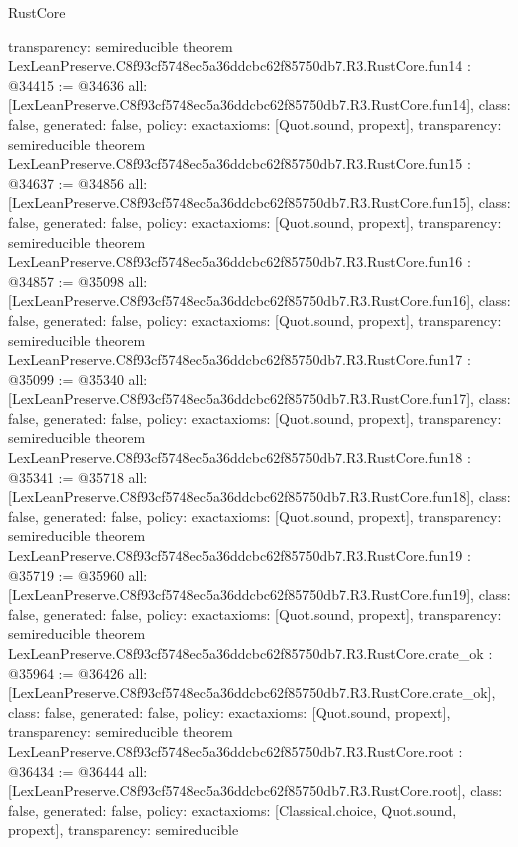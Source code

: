 \begin{lexlean}{RustCore}
\begin{coremodule}
{  transparency: semireducible
}
theorem LexLeanPreserve.C8f93cf5748ec5a36ddcbc62f85750db7.R3.RustCore.fun14 : @34415 := @34636 {
  all: [LexLeanPreserve.C8f93cf5748ec5a36ddcbc62f85750db7.R3.RustCore.fun14],
  class: false,
  generated: false,
  policy: exact{axioms: [Quot.sound, propext]},
  transparency: semireducible
}
theorem LexLeanPreserve.C8f93cf5748ec5a36ddcbc62f85750db7.R3.RustCore.fun15 : @34637 := @34856 {
  all: [LexLeanPreserve.C8f93cf5748ec5a36ddcbc62f85750db7.R3.RustCore.fun15],
  class: false,
  generated: false,
  policy: exact{axioms: [Quot.sound, propext]},
  transparency: semireducible
}
theorem LexLeanPreserve.C8f93cf5748ec5a36ddcbc62f85750db7.R3.RustCore.fun16 : @34857 := @35098 {
  all: [LexLeanPreserve.C8f93cf5748ec5a36ddcbc62f85750db7.R3.RustCore.fun16],
  class: false,
  generated: false,
  policy: exact{axioms: [Quot.sound, propext]},
  transparency: semireducible
}
theorem LexLeanPreserve.C8f93cf5748ec5a36ddcbc62f85750db7.R3.RustCore.fun17 : @35099 := @35340 {
  all: [LexLeanPreserve.C8f93cf5748ec5a36ddcbc62f85750db7.R3.RustCore.fun17],
  class: false,
  generated: false,
  policy: exact{axioms: [Quot.sound, propext]},
  transparency: semireducible
}
theorem LexLeanPreserve.C8f93cf5748ec5a36ddcbc62f85750db7.R3.RustCore.fun18 : @35341 := @35718 {
  all: [LexLeanPreserve.C8f93cf5748ec5a36ddcbc62f85750db7.R3.RustCore.fun18],
  class: false,
  generated: false,
  policy: exact{axioms: [Quot.sound, propext]},
  transparency: semireducible
}
theorem LexLeanPreserve.C8f93cf5748ec5a36ddcbc62f85750db7.R3.RustCore.fun19 : @35719 := @35960 {
  all: [LexLeanPreserve.C8f93cf5748ec5a36ddcbc62f85750db7.R3.RustCore.fun19],
  class: false,
  generated: false,
  policy: exact{axioms: [Quot.sound, propext]},
  transparency: semireducible
}
theorem LexLeanPreserve.C8f93cf5748ec5a36ddcbc62f85750db7.R3.RustCore.crate_ok : @35964 := @36426 {
  all: [LexLeanPreserve.C8f93cf5748ec5a36ddcbc62f85750db7.R3.RustCore.crate_ok],
  class: false,
  generated: false,
  policy: exact{axioms: [Quot.sound, propext]},
  transparency: semireducible
}
theorem LexLeanPreserve.C8f93cf5748ec5a36ddcbc62f85750db7.R3.RustCore.root : @36434 := @36444 {
  all: [LexLeanPreserve.C8f93cf5748ec5a36ddcbc62f85750db7.R3.RustCore.root],
  class: false,
  generated: false,
  policy: exact{axioms: [Classical.choice, Quot.sound, propext]},
  transparency: semireducible
}


\end{coremodule}
\end{lexlean}
